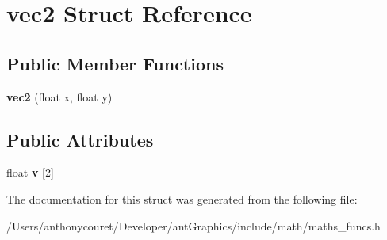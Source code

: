 \hypertarget{structvec2}{\section{vec2 Struct Reference}
\label{structvec2}
}
\subsection*{Public Member Functions}
\begin{DoxyCompactItemize}
\item 
\hypertarget{structvec2_a9486933da4d4d819a8b99bae91066cb3}{{\bfseries vec2} (float x, float y)}\label{structvec2_a9486933da4d4d819a8b99bae91066cb3}

\end{DoxyCompactItemize}
\subsection*{Public Attributes}
\begin{DoxyCompactItemize}
\item 
\hypertarget{structvec2_ae25758a321e69cf6f722589fca155735}{float {\bfseries v} \mbox{[}2\mbox{]}}\label{structvec2_ae25758a321e69cf6f722589fca155735}

\end{DoxyCompactItemize}


The documentation for this struct was generated from the following file\+:\begin{DoxyCompactItemize}
\item 
/\+Users/anthonycouret/\+Developer/ant\+Graphics/include/math/maths\+\_\+funcs.\+h\end{DoxyCompactItemize}
